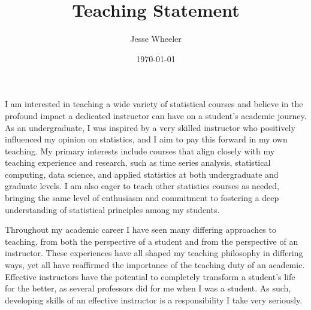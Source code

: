 \documentclass{article}
\title{Teaching Statement}
\author{Jesse Wheeler}
\date{\today}
\begin{document}
\rule{0mm}{1mm}
\vspace{-20mm}


\vspace{1mm}

\rule{0mm}{1mm}

\vspace{3mm}
\rule{0mm}{1mm}

\vspace{4mm}


\noindent
I am interested in teaching a wide variety of statistical courses and believe in the profound impact a dedicated instructor can have on a student's academic journey.
As an undergraduate, I was inspired by a very skilled instructor who positively influenced my opinion on statistics, and I aim to pay this forward in my own teaching.
My primary interests include courses that align closely with my teaching experience and research, such as time series analysis, statistical computing, data science, and applied statistics at both undergraduate and graduate levels.
I am also eager to teach other statistics courses as needed, bringing the same level of enthusiasm and commitment to fostering a deep understanding of statistical principles among my students.

Throughout my academic career I have seen many differing approaches to teaching, from both the perspective of a student and from the perspective of an instructor.
These experiences have all shaped my teaching philosophy in differing ways, yet all have reaffirmed the importance of the teaching duty of an academic.
Effective instructors have the potential to completely transform a student's life for the better, as several professors did for me when I was a student.
As such, developing skills of an effective instructor is a responsibility I take very seriously.

\end{document}
